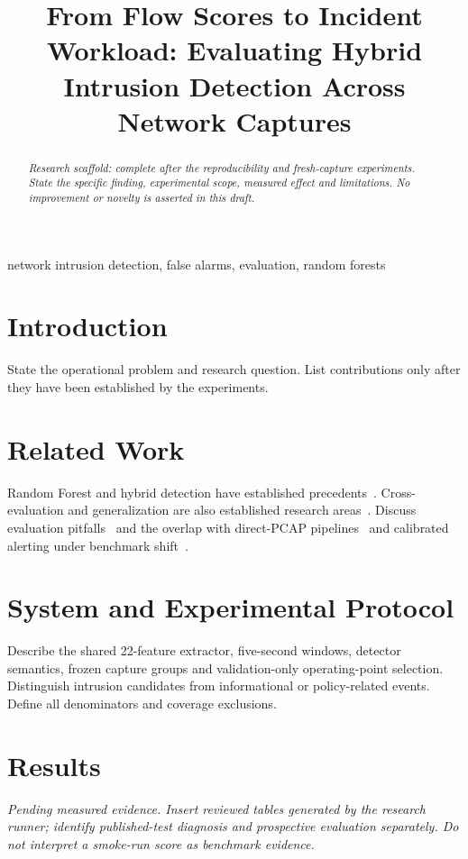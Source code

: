 \documentclass[conference]{IEEEtran}
\begin{document}
\title{From Flow Scores to Incident Workload: Evaluating Hybrid Intrusion Detection Across Network Captures}
\author{}
\maketitle
\begin{abstract}
\textit{Research scaffold: complete after the reproducibility and fresh-capture experiments. State the specific finding, experimental scope, measured effect and limitations. No improvement or novelty is asserted in this draft.}
\end{abstract}
\begin{IEEEkeywords}
network intrusion detection, false alarms, evaluation, random forests
\end{IEEEkeywords}
\section{Introduction}
State the operational problem and research question. List contributions only after they have been established by the experiments.
\section{Related Work}
Random Forest and hybrid detection have established precedents~\cite{zhang2008}. Cross-evaluation and generalization are also established research areas~\cite{apruzzese2022,cantone2024}. Discuss evaluation pitfalls~\cite{arp2022} and the overlap with direct-PCAP pipelines~\cite{cho2026} and calibrated alerting under benchmark shift~\cite{jin2026}.
\section{System and Experimental Protocol}
Describe the shared 22-feature extractor, five-second windows, detector semantics, frozen capture groups and validation-only operating-point selection. Distinguish intrusion candidates from informational or policy-related events. Define all denominators and coverage exclusions.
\section{Results}
\textit{Pending measured evidence. Insert reviewed tables generated by the research runner; identify published-test diagnosis and prospective evaluation separately. Do not interpret a smoke-run score as benchmark evidence.}
\end{document}
